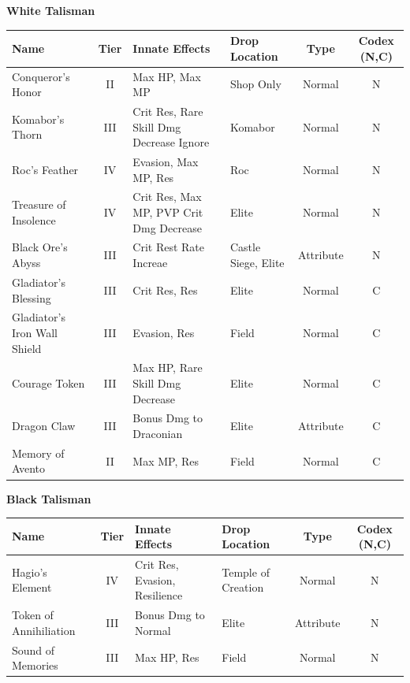 \documentclass[]{article}
\begin{document}
\begin{center}
\pagebreak
\textbf{White Talisman}
\begin{tabular}{|>{\centering}m{4cm}|c|>{\centering}m{4cm}|>{\centering}m{3cm}|c|c|}
	\hline 
	Name & Tier & Innate Effects & Drop Location & Type&Codex (N,C) \\ 
	\hline 
	Conqueror's Honor & II & Max HP, Max MP & Shop Only & Normal &N \\ 
	Komabor's Thorn & III & Crit Res, Rare Skill Dmg Decrease Ignore & Komabor & Normal & N\\ 
	Roc's Feather & IV & Evasion, Max MP, Res & Roc & Normal &N\\ 
	Treasure of Insolence & IV & Crit Res, Max MP, PVP Crit Dmg Decrease & Elite & Normal &N\\ 
	Black Ore's Abyss & III & Crit Rest Rate Increae & Castle Siege, Elite & Attribute &N\\ 
	
	Gladiator's Blessing & III & Crit Res, Res & Elite & Normal & C\\
	
	Gladiator's Iron Wall Shield & III & Evasion, Res & Field & Normal & C\\
	
	Courage Token & III & Max HP, Rare Skill Dmg Decrease & Elite & Normal & C\\
	
	Dragon Claw & III & Bonus Dmg to Draconian & Elite & Attribute & C\\
	
	Memory of Avento & II & Max MP, Res & Field & Normal & C\\
	
	\hline 
\end{tabular} 

\textbf{Black Talisman}

\begin{tabular}{|>{\centering}m{4cm}|c|>{\centering}m{4cm}|>{\centering}m{3cm}|c|c|}
	\hline 
	Name & Tier & Innate Effects & Drop Location & Type & Codex (N,C)\\ 
	\hline 
	Hagio's Element & IV & Crit Res, Evasion, Resilience & Temple of Creation & Normal &N\\ 
	Token of Annihiliation & III & Bonus Dmg to Normal & Elite & Attribute &N\\ 
	
	Sound of Memories & III & Max HP, Res & Field & Normal & N\\
	

	\hline 
\end{tabular} 
\end{center}
\end{document}
